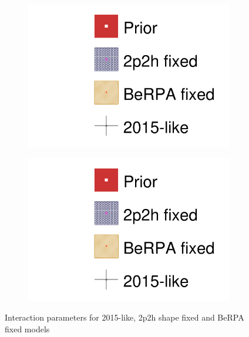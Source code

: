 \begin{figure}[h]
	\begin{subfigure}[t]{0.49\textwidth}
		\includegraphics[width=\textwidth, trim={0mm 0mm 0mm 0mm}, clip,page=20]{figures/mach3/data/alt/2017b_NewData_NewDet_hpc_2p2hshapeFix_0_2017b_NewData_NewDet_hpc_BeRPAfix_0_2017b_NewData_NewDet_hpc_2015like_0.pdf}
	\end{subfigure}
	\begin{subfigure}[t]{0.49\textwidth}
		\includegraphics[width=\textwidth, trim={0mm 0mm 0mm 0mm}, clip,page=21]{figures/mach3/data/alt/2017b_NewData_NewDet_hpc_2p2hshapeFix_0_2017b_NewData_NewDet_hpc_BeRPAfix_0_2017b_NewData_NewDet_hpc_2015like_0.pdf}
	\end{subfigure}
	\caption{Interaction parameters for 2015-like, 2p2h shape fixed and BeRPA fixed models}
	\label{fig:2015like_berpa_2p2h_comp_xsec}
\end{figure}

